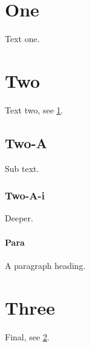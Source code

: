 \documentclass{article}
\begin{document}
\section{One}\label{s1} Text one.
\section{Two}\label{s2} Text two, see \ref{s1}.
\subsection{Two-A} Sub text.
\subsubsection{Two-A-i} Deeper.
\paragraph{Para} A paragraph heading.
\section{Three} Final, see \ref{s2}.
\end{document}
